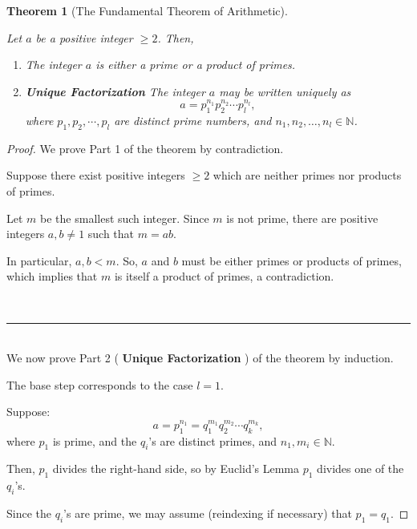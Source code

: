 \documentclass[a4paper,12pt]{report}
\newcounter{statement}
\numberwithin{statement}{chapter}
\newtheorem{thm}[statement]{Theorem}
\numberwithin{equation}{chapter}
\numberwithin{section}{chapter}
\numberwithin{subsection}{section}
\begin{document}
\begin{thm}[The Fundamental Theorem of Arithmetic]

\label{thm:fta}



Let $a$ be a positive integer $\geq 2$. Then,
\begin{enumerate}
\item 
The integer $a$ is either a prime or a product of primes.

\item 
 {\bf Unique Factorization} 
The integer $a$ may be written uniquely as
\[
a = p_1^{n_1}p_2^{n_2}\cdots p_l^{n_l},
\]
where $p_1, p_2, \cdots, p_l$ are distinct prime numbers, and $n_1, n_2, \ldots, n_l \in \mathbb{N}$.
\end{enumerate}
\end{thm}
\begin{proof}

We prove Part 1 of the theorem by contradiction.




Suppose there exist positive integers $\geq 2$ which are neither primes
nor products of primes.




Let $m$ be the smallest such integer. Since $m$ is not prime, there are
positive integers $a, b \neq 1$ such that $m = ab$.




In particular, $a, b < m$.
So, $a$ and $b$ must be either primes or products of primes, which implies that $m$ is itself a product of primes, a contradiction.

\quad\\\hrule
\quad\\


We now prove Part 2 ( {\bf Unique Factorization} ) of the theorem by induction.




The base step corresponds to the case $l = 1$.




Suppose:
\[
a = p_1^{n_1} = q_1^{m_1}q_2^{m_2}\cdots q_k^{m_k},
\]
where $p_1$ is prime, and the $q_i$'s are distinct primes,
and $n_1, m_i \in \mathbb{N}$.




Then, $p_1$ divides the right-hand side,
so by Euclid's Lemma $p_1$ divides one of the $q_i$'s.




Since the $q_i$'s are prime, we may assume (reindexing if necessary) that $p_1 = q_1$.





\end{proof}
\end{document}
